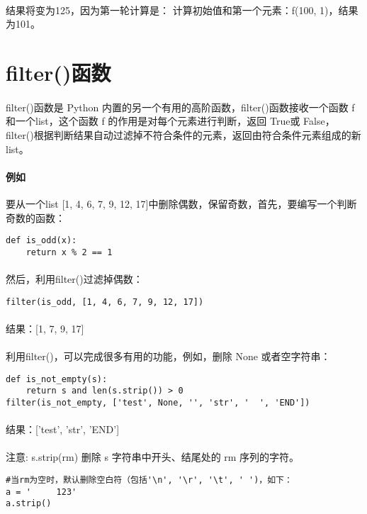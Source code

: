 \documentclass{article}
\begin{document}
\begin{CJK}{UTF8}{gbsn}
\paragraph{}
结果将变为125，因为第一轮计算是：
计算初始值和第一个元素：f(100, 1)，结果为101。
\section{filter()函数}
\paragraph{}
filter()函数是 Python 内置的另一个有用的高阶函数，filter()函数接收一个函数 f 和一个list，这个函数 f 的作用是对每个元素进行判断，返回 True或 False，filter()根据判断结果自动过滤掉不符合条件的元素，返回由符合条件元素组成的新list。
\paragraph{例如}
要从一个list [1, 4, 6, 7, 9, 12, 17]中删除偶数，保留奇数，首先，要编写一个判断奇数的函数：
\begin{verbatim}
def is_odd(x):
    return x % 2 == 1
\end{verbatim}
\paragraph{}
然后，利用filter()过滤掉偶数：
\begin{verbatim}
filter(is_odd, [1, 4, 6, 7, 9, 12, 17])
\end{verbatim}
\paragraph{}
结果：[1, 7, 9, 17]
\paragraph{}
利用filter()，可以完成很多有用的功能，例如，删除 None 或者空字符串：
\begin{verbatim}
def is_not_empty(s):
    return s and len(s.strip()) > 0
filter(is_not_empty, ['test', None, '', 'str', '  ', 'END'])
\end{verbatim}
\paragraph{}
结果：['test', 'str', 'END']
\paragraph{}
注意: s.strip(rm) 删除 s 字符串中开头、结尾处的 rm 序列的字符。
\begin{verbatim}
#当rm为空时，默认删除空白符（包括'\n', '\r', '\t', ' ')，如下：
a = '     123'
a.strip()
\end{verbatim}

\end{CJK}
\end{document}

